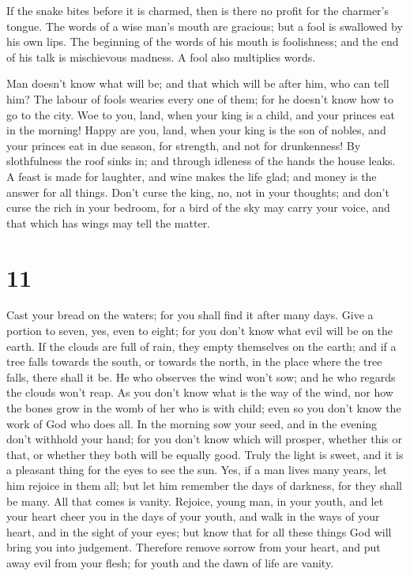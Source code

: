  If the snake bites before it is charmed, then is there
no profit for the charmer's tongue.  The words of a wise
man's mouth are gracious; but a fool is swallowed by his own lips.
 The beginning of the words of his mouth is foolishness;
and the end of his talk is mischievous madness.  A fool
also multiplies words.

Man doesn't know what will be; and that which will be after him, who can
tell him?  The labour of fools wearies every one of them;
for he doesn't know how to go to the city.  Woe to you,
land, when your king is a child, and your princes eat in the morning!
 Happy are you, land, when your king is the son of
nobles, and your princes eat in due season, for strength, and not for
drunkenness!  By slothfulness the roof sinks in; and
through idleness of the hands the house leaks.  A feast
is made for laughter, and wine makes the life glad; and money is the
answer for all things.  Don't curse the king, no, not in
your thoughts; and don't curse the rich in your bedroom, for a bird of
the sky may carry your voice, and that which has wings may tell the
matter.

\hypertarget{section-10}{%
\section{11}\label{section-10}}

 Cast your bread on the waters; for you shall find it
after many days.  Give a portion to seven, yes, even to
eight; for you don't know what evil will be on the earth. 
If the clouds are full of rain, they empty themselves on the earth; and
if a tree falls towards the south, or towards the north, in the place
where the tree falls, there shall it be.  He who observes
the wind won't sow; and he who regards the clouds won't reap.
 As you don't know what is the way of the wind, nor how
the bones grow in the womb of her who is with child; even so you don't
know the work of God who does all.  In the morning sow
your seed, and in the evening don't withhold your hand; for you don't
know which will prosper, whether this or that, or whether they both will
be equally good.  Truly the light is sweet, and it is a
pleasant thing for the eyes to see the sun.  Yes, if a man
lives many years, let him rejoice in them all; but let him remember the
days of darkness, for they shall be many. All that comes is vanity.
 Rejoice, young man, in your youth, and let your heart
cheer you in the days of your youth, and walk in the ways of your heart,
and in the sight of your eyes; but know that for all these things God
will bring you into judgement.  Therefore remove sorrow
from your heart, and put away evil from your flesh; for youth and the
dawn of life are vanity.


